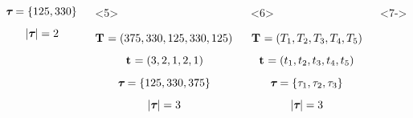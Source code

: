\begin{frame}
\begin{columns}[c]
\begin{onlyenv}
\begin{displaybox}[4.5cm]
\[                    \boldsymbol{\tau_{}} = \{125,330\}
                \]\vspace{0mm}
                \[
                    \lvert \boldsymbol{\tau_{}} \rvert = 2
                \]\vspace{0mm}
            \end{displaybox}
            \end{onlyenv}
            \begin{onlyenv}<5>
            \begin{displaybox}[4.5cm]
                {\small
                \[
                    \mathbf{T_{}} = (375,330,125,330,125)
                \]\vspace{0mm}
                }
                \[
                    \mathbf{t_{}} = (3,2,1,2,1)
                \]\vspace{0mm}
                \[
                    \boldsymbol{\tau_{}} = \{125,330,375\}
                \]\vspace{0mm}
                \[
                    \lvert \boldsymbol{\tau_{}} \rvert = 3
                \]\vspace{0mm}
            \end{displaybox}
            \end{onlyenv}
            \begin{onlyenv}<6>
            \begin{displaybox}[4.5cm]
                {\small
                \[
                    \mathbf{T_{}} = (T_{1},T_{2},T_{3},T_{4},T_{5})
                \]\vspace{0mm}
                }
                \[
                    \mathbf{t_{}} = (t_{1},t_{2},t_{3},t_{4},t_{5})
                \]\vspace{0mm}
                \[
                    \boldsymbol{\tau_{}} = \{\tau_{1},\tau_{2},\tau_{3}\}
                \]\vspace{0mm}
                \[
                    \lvert \boldsymbol{\tau_{}} \rvert = 3
                \]\vspace{0mm}
            \end{displaybox}
            \end{onlyenv}
            \begin{onlyenv}<7->
            \begin{displaybox}[4.5cm]
                {\small
}
\end{displaybox}
\end{onlyenv}
\end{columns}
\end{frame}
